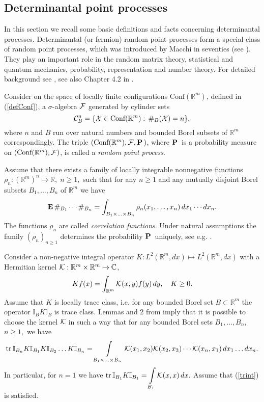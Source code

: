 \documentclass{article}
\numberwithin{equation}{section}
\newcommand{\mC}{\mathbb{C}}
\newcommand{\mR}{\mathbb{R}}
\newcommand{\mI}{\mathbb{I}}
\newcommand{\CC}{{\cal C}}
\newcommand{\FF}{{\cal F}}
\newcommand{\KK}{{\cal K}}
\newcommand{\XX}{{\cal X}}
\newcommand{\tr}{\operatorname{tr}}
\newcommand{\MO}{\mbox{\bf E}\,}
\newcommand{\PR}{\mbox{\bf P}\,}
\newcommand{\ds}{\displaystyle{}}
\newcommand{\qu}{\quad}
\newcommand{\ili}{\int\limits}
\newcommand{\lbl}{\label}
\newcommand{\bee}{\begin{equation}}
\newcommand{\eee}{\end{equation}}
\newcommand{\Conf}{\mbox{Conf}}
\newcommand{\CoRr}{\Conf(\mR^m)}
\begin{document}
\subsection{Determinantal point processes}
\lbl{sec:detproc}

In this section we recall some basic definitions and facts
concerning determinantal processes.
Determinantal (or fermion) random point processes
form a special class of random point processes,
which was introduced by Macchi in seventies (see \cite{Ma75,Ma77, DVJ}).
They play an important role in the random matrix theory,
statistical and quantum mechanics, probability, representation and number theory.
For detailed background see \cite{So00,ST,STa},
see also Chapter 4.2 in \cite{AGZ}.



Consider on the space of locally finite configurations  $\CoRr$,
defined in (\ref{defConf}),  a $\sigma$-algebra $\FF$
generated by cylinder sets
$$
\CC^n_B=\{\XX\in\CoRr:\, \#_B(\XX)=n\},
$$
where $n$ and $B$ run over natural numbers and bounded Borel subsets of $\mR^m$ correspondingly.
The triple $(\CoRr,\FF,\PR)$,
where $\PR$ is a probability measure on $(\CoRr,\FF)$,
is called a {\it  random point process}.

Assume that there exists a family of locally integrable nonnegative functions
$
\rho_n:(\mR^m)^n\mapsto\mR, \; n\geq 1,
$
such that for any $n\geq 1$ and any mutually disjoint Borel subsets $B_1,\ldots,B_n$ of $\mR^m$
we have
$$
\MO \#_{B_1}\cdots \#_{B_n}
= \int_{B_1\times\ldots\times B_n}\rho_n(x_1,\ldots,x_n)\, dx_1 \cdots dx_n.
$$
The functions $\rho_n$ are called {\it correlation functions}.
Under natural assumptions the family  $(\rho_n)_{n\geq 1}$  determines the probability $\PR$ uniquely, see e.g. \cite{So00}.

Consider a non-negative integral operator
$K: L^2(\mR^m,dx)\mapsto L^2(\mR^m,dx)$
with a Hermitian kernel $\KK:\mR^m\times\mR^m\mapsto \mC$,
\bee\lbl{K}
K f(x)=\int_{\mR^m} \KK(x,y) f(y)\,dy, \qu K\geq 0.
\eee
Assume that $K$ is locally trace class,
i.e. for any bounded Borel set $B\subset\mR^m$
the operator
$\mI_B K \mI_B$
is trace class.
Lemmas  and 2 from \cite{So00} imply
that it is possible to choose the kernel $\KK$ in such a way
that for any bounded Borel sets $B_1,\ldots,B_n$, $n\geq 1,$ we have
\bee\lbl{trint}
\tr \mI_{B_n}K\mI_{B_1}K\mI_{B_2}\ldots K\mI_{B_n}
= \ili_{B_1\times\ldots\times B_n} \KK(x_1,x_2)\KK(x_2,x_3)\cdots\KK(x_n,x_1)\, dx_1\ldots dx_n.
\eee
In particular, for $n=1$ we have
$\ds{\tr \mI_{B_1}K\mI_{B_1}=\ili_{B_1}\KK(x,x)\, dx.}$
Assume that (\ref{trint}) is satisfied.
\end{document}
